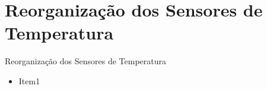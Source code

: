 \section{Reorganização dos Sensores de Temperatura}


\begin{frame}{Reorganização dos Sensores de Temperatura}

{\footnotesize
\begin{itemize}
    \item Item1
\end{itemize}
}
\vspace{-0.2cm}
\end{frame}
